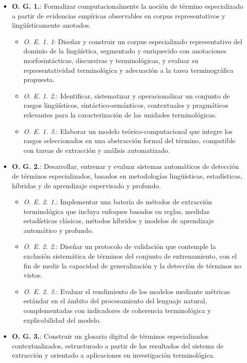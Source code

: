 \begin{itemize}
    \item \textbf{O. G. 1.}: Formalizar computacionalmente la noción de término especializado a partir de evidencias empíricas observables en corpus representativos y lingüísticamente anotados.
    \begin{itemize}
        \item \textit{O. E. 1. 1}: Diseñar y construir un corpus especializado representativo del dominio de la lingüística, segmentado y enriquecido con anotaciones morfosintácticas, discursivas y terminológicas, y evaluar su representatividad terminológica y adecuación a la tarea terminográfica propuesta.
        \item \textit{O. E. 1. 2.}: Identificar, sistematizar y operacionalizar un conjunto de rasgos lingüísticos, sintáctico-semánticos, contextuales y pragmáticos relevantes para la caracterización de las unidades terminológicas.
        \item \textit{O. E. 1. 3.}: Elaborar un modelo teórico-computacional que integre los rasgos seleccionados en una abstracción formal del término, compatible con tareas de extracción y análisis automatizado.
    \end{itemize}
    \item \textbf{O. G. 2.}: Desarrollar, entrenar y evaluar sistemas automáticos de detección de términos especializados, basados en metodologías lingüísticas, estadísticas, híbridas y de aprendizaje supervisado y profundo.
    \begin{itemize}
        \item \textit{O. E. 2. 1.}: Implementar una batería de métodos de extracción terminológica que incluya enfoques basados en reglas, medidas estadísticas clásicas, métodos híbridos y modelos de aprendizaje automático y profundo.
        \item \textit{O. E. 2. 2}.: Diseñar un protocolo de validación que contemple la exclusión sistemática de términos del conjunto de entrenamiento, con el fin de medir la capacidad de generalización y la detección de términos no vistos.
        \item \textit{O. E. 2. 3.}: Evaluar el rendimiento de los modelos mediante métricas estándar en el ámbito del procesamiento del lenguaje natural, complementadas con indicadores de coherencia terminológica y explicabilidad del modelo.
        \end{itemize}
    \item \textbf{O. G. 3.}: Construir un glosario digital de términos especializados contextualizados, estructurado a partir de los resultados del sistema de extracción y orientado a aplicaciones en investigación terminológica.

\end{itemize}
